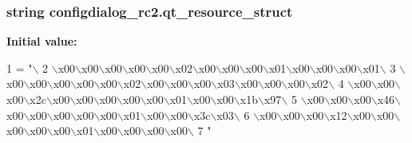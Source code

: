 \subsubsection[{qt\+\_\+resource\+\_\+struct}]{\setlength{\rightskip}{0pt plus 5cm}string configdialog\+\_\+rc2.\+qt\+\_\+resource\+\_\+struct}\label{namespaceconfigdialog__rc2_aac6b8df1b9e6e4bb14ed1885360b3449}
{\bfseries Initial value\+:}
\begin{DoxyCode}
1 = \textcolor{stringliteral}{"\(\backslash\)}
2 \textcolor{stringliteral}{\(\backslash\)x00\(\backslash\)x00\(\backslash\)x00\(\backslash\)x00\(\backslash\)x00\(\backslash\)x02\(\backslash\)x00\(\backslash\)x00\(\backslash\)x00\(\backslash\)x01\(\backslash\)x00\(\backslash\)x00\(\backslash\)x00\(\backslash\)x01\(\backslash\)}
3 \textcolor{stringliteral}{\(\backslash\)x00\(\backslash\)x00\(\backslash\)x00\(\backslash\)x00\(\backslash\)x00\(\backslash\)x02\(\backslash\)x00\(\backslash\)x00\(\backslash\)x00\(\backslash\)x03\(\backslash\)x00\(\backslash\)x00\(\backslash\)x00\(\backslash\)x02\(\backslash\)}
4 \textcolor{stringliteral}{\(\backslash\)x00\(\backslash\)x00\(\backslash\)x00\(\backslash\)x2c\(\backslash\)x00\(\backslash\)x00\(\backslash\)x00\(\backslash\)x00\(\backslash\)x00\(\backslash\)x01\(\backslash\)x00\(\backslash\)x00\(\backslash\)x1b\(\backslash\)x97\(\backslash\)}
5 \textcolor{stringliteral}{\(\backslash\)x00\(\backslash\)x00\(\backslash\)x00\(\backslash\)x46\(\backslash\)x00\(\backslash\)x00\(\backslash\)x00\(\backslash\)x00\(\backslash\)x00\(\backslash\)x01\(\backslash\)x00\(\backslash\)x00\(\backslash\)x3c\(\backslash\)x03\(\backslash\)}
6 \textcolor{stringliteral}{\(\backslash\)x00\(\backslash\)x00\(\backslash\)x00\(\backslash\)x12\(\backslash\)x00\(\backslash\)x00\(\backslash\)x00\(\backslash\)x00\(\backslash\)x00\(\backslash\)x01\(\backslash\)x00\(\backslash\)x00\(\backslash\)x00\(\backslash\)x00\(\backslash\)}
7 \textcolor{stringliteral}{"}
\end{DoxyCode}
